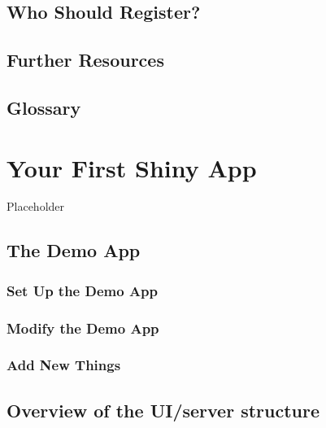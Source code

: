 \documentclass[
]{book}
\begin{document}
\hypertarget{who-should-register}{%
\section{Who Should Register?}\label{who-should-register}}

\hypertarget{further-resources}{%
\section{Further Resources}\label{further-resources}}

\hypertarget{glossary-intro}{%
\section{Glossary}\label{glossary-intro}}

\hypertarget{first-app}{%
\chapter{Your First Shiny App}\label{first-app}}

Placeholder

\hypertarget{the-demo-app}{%
\section{The Demo App}\label{the-demo-app}}

\hypertarget{set-up-the-demo-app}{%
\subsection{Set Up the Demo App}\label{set-up-the-demo-app}}

\hypertarget{modify-the-demo-app}{%
\subsection{Modify the Demo App}\label{modify-the-demo-app}}

\hypertarget{add-new-things}{%
\subsection{Add New Things}\label{add-new-things}}

\hypertarget{overview-of-the-uiserver-structure}{%
\section{Overview of the UI/server structure}\label{overview-of-the-uiserver-structure}}
\end{document}
